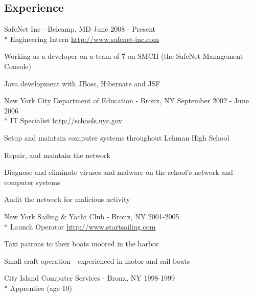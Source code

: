 \documentclass[a4paper,margin,line]{resume}
\begin{document}
\begin{resume}
\section{\mysidestyle Experience}
	\begin{compactdesc}
		\item[SafeNet Inc] - Belcamp, MD \hfill {\small June 2008 - Present}
		\\* Engineering Intern \hfill {\footnotesize
		\url{http://www.safenet-inc.com}}
		\begin{compactitem}
			\item {\small Working as a developer on a team of 7 on SMCII (the
			SafeNet Management Console)}
			\item {\small Java development with JBoss, Hibernate and JSF}
		\end{compactitem}
		\item[New York City Department of Education] - Bronx, NY \hfill
		{\small September 2002 - June 2006}
		\\* IT Specialist \hfill {\footnotesize \url{http://schools.nyc.gov}}
		\begin{compactitem}
			\item {\small Setup and maintain computer systems throughout Lehman
			High School}
			\item {\small Repair, and maintain the network}
			\item {\small Diagnose and eliminate viruses and malware on the
			school's network and computer systems}
			\item {\small Audit the network for malicious activity}
		\end{compactitem}

		\item[New York Sailing \& Yacht Club] - Bronx, NY \hfill {\small
		2001-2005}
		\\* Launch Operator \hfill {\footnotesize \url{http://www.startsailing.com}}
		\begin{compactitem}
			\item {\small Taxi patrons to their boats moored in the harbor}
			\item {\small Small craft operation - experienced in motor and sail
			boats}
		\end{compactitem}

		\item[City Island Computer Services] - Bronx, NY \hfill {\small
		1998-1999}
		\\* Apprentice (age 10)
	\end{compactdesc}


\end{resume}
\end{document}
